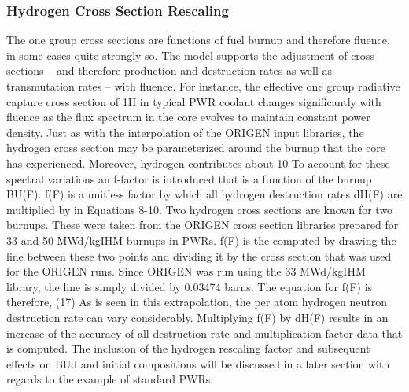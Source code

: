 \subsubsection{Hydrogen Cross Section Rescaling}
\label{1g_sec:H_rescale}
The one group cross sections are functions of fuel burnup and therefore fluence, in some cases quite strongly so.  The model supports the adjustment of cross sections – and therefore production and destruction rates as well as transmutation rates – with fluence.  For instance, the effective one group radiative capture cross section of 1H in typical PWR coolant changes significantly with fluence as the flux spectrum in the core evolves to maintain constant power density.  Just as with the interpolation of the ORIGEN input libraries, the hydrogen cross section may be parameterized around the burnup that the core has experienced.  Moreover, hydrogen contributes about 10%
To account for these spectral variations an f-factor is introduced that is a function of the burnup BU(F).    f(F) is a unitless factor by which all hydrogen destruction rates dH(F) are multiplied by in Equations 8-10. Two hydrogen cross sections are known for two burnups.  These were taken from the ORIGEN cross section libraries prepared for 33 and 50 MWd/kgIHM burnups in PWRs.
f(F) is the computed by drawing the line between these two points and dividing it by the cross section that was used for the ORIGEN runs.  Since ORIGEN was run using the 33 MWd/kgIHM library, the line is simply divided by 0.03474 barns.  The equation for f(F) is therefore, 
                        (17)
As is seen in this extrapolation, the per atom hydrogen neutron destruction rate can vary considerably.  Multiplying f(F) by dH(F) results in an increase of the accuracy of all destruction rate and multiplication factor data that is computed.  The inclusion of the hydrogen rescaling factor and subsequent effects on BUd and initial compositions will be discussed in a later section with regards to the example of standard PWRs.  



